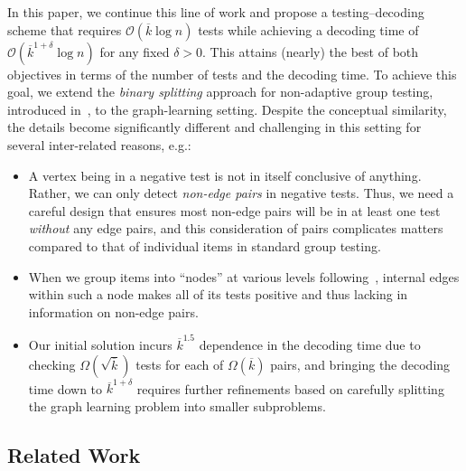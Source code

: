 \documentclass[journal]{IEEEtran}
\theoremstyle{definition}
\theoremstyle{definition}
\newcommand{\kb}{\overline{k}}
\newcommand{\bigO}{\mathcal{O}}
\begin{document}
In this paper, we continue this line of work and propose a testing--decoding scheme that requires $\bigO(\kb \log n)$ tests while achieving a decoding time of $\bigO(\kb^{1+\delta}\log n)$ for any fixed $\delta>0$. This attains (nearly) the best of both objectives in terms of the number of tests and the decoding time. To achieve this goal, we extend the \emph{binary splitting} approach for non\mbox{-}adaptive group testing, introduced in~\cite{price2020fast}, to the graph-learning setting.  Despite the conceptual similarity, the details become significantly different and challenging in this setting for several inter-related reasons, e.g.:
\begin{itemize}
    \item A vertex being in a negative test is not in itself conclusive of anything. Rather, we can only detect \emph{non-edge pairs} in negative tests.
Thus, we need a careful design that ensures most non-edge pairs will be in at least one test \emph{without} any edge pairs, and this consideration of pairs complicates matters compared to that of individual items in standard group testing.
    \item When we group items into ``nodes'' at various levels following~\cite{price2020fast}, internal edges within such a node makes all of its tests positive and thus lacking in information on non-edge pairs.
    \item Our initial solution incurs $\kb^{1.5}$ dependence in the decoding time due to checking $\Omega(\sqrt{\kb})$ tests for each of $\Omega(\kb)$ pairs, and bringing the decoding time down to $\kb^{1+\delta}$ requires further refinements based on carefully splitting the graph learning problem into smaller subproblems.
\end{itemize}

\subsection{Related Work}
\label{sec:related_work}
\end{document}
